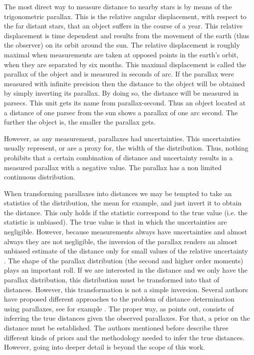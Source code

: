 The most direct way to measure distance to nearby stars is by means of the trigonometric parallax. This is the relative angular displacement, with respect to the far distant stars, that an object suffers in the course of a year. This relative displacement is time dependent and results from the movement of the earth (thus the observer) on its orbit around the sun. The relative displacement is roughly maximal when measurements are taken at opposed points in the earth's orbit, when they are separated by six months. This maximal displacement is called the parallax of the object and is measured in seconds of arc. If the parallax were measured with infinite precision then the distance to the object will be obtained by simply inverting its parallax. By doing so, the distance will be measured in parsecs. This unit gets its name from parallax-second. Thus an object located at a distance of one parsec from the sun shows a parallax of one arc second. The further the object is, the smaller the parallax gets.

However, as any measurement, parallaxes had uncertainties. This uncertainties usually represent, or are a proxy for, the width of the distribution. Thus, nothing prohibits that a certain combination of distance and uncertainty results in a measured parallax with a negative value. The parallax has a non limited continuous distribution. 

When transforming parallaxes into distances we may be tempted to take an statistics of the distribution, the mean for example, and just invert it to obtain the distance. This only holds if the statistic correspond to the true value (i.e. the statistic is unbiased). The true value is that in which the uncertainties are negligible. However, because measurements always have uncertainties and almost always they are not negligible, the inversion of the parallax renders an almost unbiased estimate of the distance only for small values of the relative uncertainty \cite[][mention that a reasonable value is below 0.15-0.20]{Lutz1973}. The shape of the parallax distribution (the second and higher order moments) plays an important roll. If we are interested in the distance and we only have the parallax distribution, this distribution must be transformed into that of distances. However, this transformation is not a simple inversion.  
Several authors have proposed different approaches to the problem of distance determination using parallaxes, see for example \citet{Lutz1973,2015PASP..127..994B,2016ApJ...832..137A,2016ApJ...833..119A}. The proper way, as \citet{2015PASP..127..994B} points out, consists of inferring the true distances given the observed parallaxes. For that, a prior on the distance must be established. The authors mentioned before describe three different kinds of priors and the methodology needed to infer the true distances. However, going into deeper detail is beyond the scope of this work.

